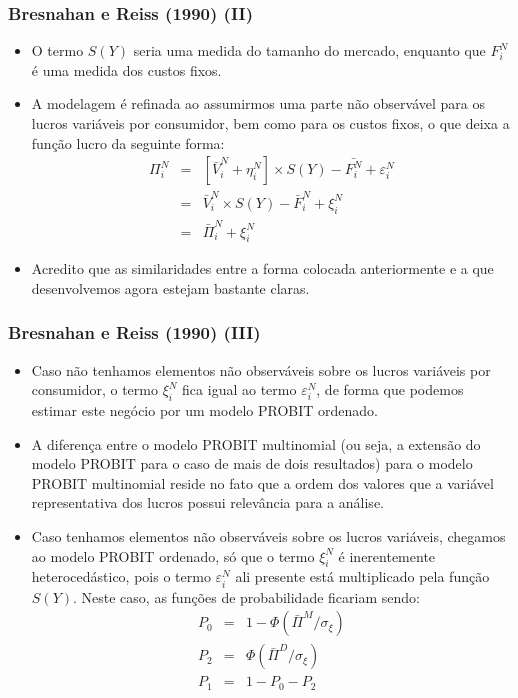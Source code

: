 \documentclass{beamer}
\begin{document}
\begin{frame}\frametitle{Bresnahan e Reiss (1990) (II)}

\begin{itemize}
\item O termo $S(Y)$ seria uma medida do tamanho do mercado, enquanto que
$F_{i}^{N}$ é uma medida dos custos fixos. 
\item A modelagem é refinada ao assumirmos uma parte não observável para
os lucros variáveis por consumidor, bem como para os custos fixos,
o que deixa a função lucro da seguinte forma:
\begin{eqnarray*}
\Pi_{i}^{N} & = & [\bar{V}_{i}^{N}+\eta_{i}^{N}]\times S(Y)-\bar{F_{i}^{N}}+\varepsilon_{i}^{N}\\
 & = & \bar{V}_{i}^{N}\times S(Y)-\bar{F}_{i}^{N}+\xi_{i}^{N}\\
 & = & \bar{\Pi}_{i}^{N}+\xi_{i}^{N}
\end{eqnarray*}
\item Acredito que as similaridades entre a forma colocada anteriormente
e a que desenvolvemos agora estejam bastante claras. 
\end{itemize}
\end{frame}

\begin{frame}\frametitle{Bresnahan e Reiss (1990) (III)}
\scriptsize
\begin{itemize}
\item Caso não tenhamos elementos não observáveis sobre os lucros variáveis
por consumidor, o termo $\xi_{i}^{N}$ fica igual ao termo $\varepsilon_{i}^{N}$,
de forma que podemos estimar este negócio por um modelo PROBIT ordenado. 
\item A diferença entre o modelo PROBIT multinomial (ou seja, a extensão
do modelo PROBIT para o caso de mais de dois resultados) para o modelo
PROBIT multinomial reside no fato que a ordem dos valores que a variável
representativa dos lucros possui relevância para a análise. 
\item Caso tenhamos elementos não observáveis sobre os lucros variáveis,
chegamos ao modelo PROBIT ordenado, só que o termo $\xi_{i}^{N}$
é inerentemente heterocedástico, pois o termo $\varepsilon_{i}^{N}$
ali presente está multiplicado pela função $S(Y)$. Neste caso, as
funções de probabilidade ficariam sendo:
\begin{eqnarray*}
P_{0} & = & 1-\Phi(\bar{\Pi}^{M}/\sigma_{\xi})\\
P_{2} & = & \Phi(\bar{\Pi}^{D}/\sigma_{\xi})\\
P_{1} & = & 1-P_{0}-P_{2}
\end{eqnarray*}
\end{itemize}
\end{frame}
\end{document}
